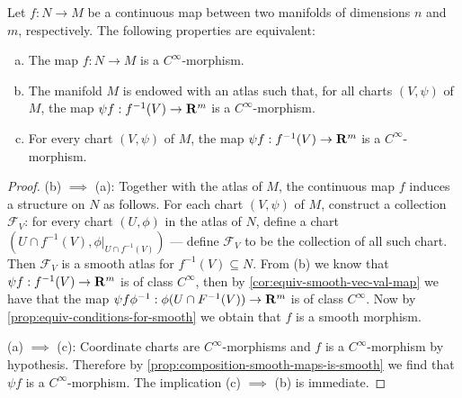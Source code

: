 \begin{proposition}
    \label{prop:smooth-morphisms-from-real-maps}
    Let \(f: N \to M\) be a continuous map between two manifolds of dimensions \(n\)
    and \(m\), respectively. The following properties are equivalent:
    \begin{enumerate}[(a)]\setlength\itemsep{0em}
        \item The map \(f: N \to M\) is a \(C^{\infty}\)-morphism.

        \item The manifold \(M\) is endowed with an atlas such that, for all charts
              \((V, \psi)\) of \(M\), the map \(\psi f: f^{-1}(V) \to \mathbf{R}^m\) is a
              \(C^{\infty}\)-morphism.

        \item For every chart \((V, \psi)\) of \(M\), the map \(\psi f: f^{-1}(V) \to
              \mathbf{R}^m\) is a \(C^{\infty}\)-morphism.
    \end{enumerate}
\end{proposition}

\begin{proof}
    (b) \(\implies\) (a): Together with the atlas of \(M\), the continuous map \(f\)
    induces a structure on \(N\) as follows. For each chart \((V, \psi)\) of \(M\),
    construct a collection \(\mathcal{F}_V\): for every chart \((U, \phi)\) in the
    atlas of \(N\), define a chart \((U \cap f^{-1}(V), \phi|_{U \cap f^{-1}(V)})\)
    --- define \(\mathcal{F}_V\) to be the collection of all such chart. Then
    \(\mathcal{F}_V\) is a smooth atlas for \(f^{-1}(V) \subseteq N\). From (b) we
    know that \(\psi f: f^{-1}(V) \to \mathbf{R}^m\) is of class \(C^{\infty}\), then by
    \cref{cor:equiv-smooth-vec-val-map} we have that the map
    \(\psi f \phi^{-1}: \phi(U \cap F^{-1}(V)) \to \mathbf{R}^m\) is of class
    \(C^{\infty}\). Now by \cref{prop:equiv-conditions-for-smooth} we obtain that
    \(f\) is a smooth morphism.

    (a) \(\implies\) (c): Coordinate charts are \(C^{\infty}\)-morphisms and \(f\)
    is a \(C^{\infty}\)-morphism by hypothesis. Therefore by
    \cref{prop:composition-smooth-maps-is-smooth} we find that \(\psi f\) is a
    \(C^{\infty}\)-morphism. The implication (c) \(\implies\) (b) is immediate.
\end{proof}

